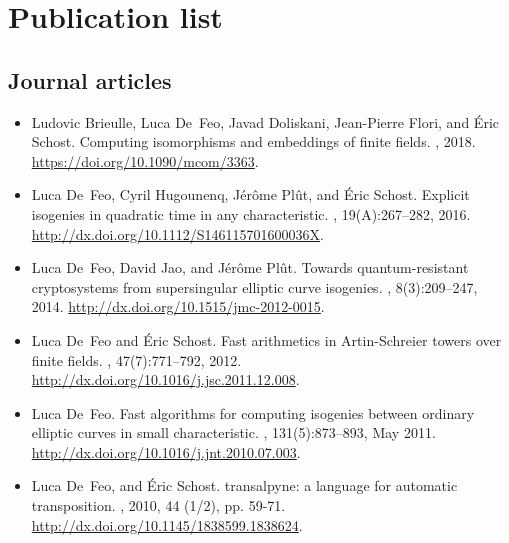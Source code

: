 \documentclass{book}
\begin{document}
\section*{Publication list}

\subsection*{Journal articles}
\begin{itemize}
\item
Ludovic Brieulle, Luca De~Feo, Javad Doliskani, Jean-Pierre Flori, and {\'E}ric
  Schost.
\newblock Computing isomorphisms and embeddings of finite fields.
, 2018.
\newblock \url{https://doi.org/10.1090/mcom/3363}.

\item
Luca De~Feo, Cyril Hugounenq, J{\'e}r{\^o}me Pl{\^u}t, and {\'E}ric Schost.
\newblock Explicit isogenies in quadratic time in any characteristic.
, 19(A):267--282,
  2016.
  \newblock \url{http://dx.doi.org/10.1112/S146115701600036X}.
  
\item
Luca De~Feo, David Jao, and J{\'e}r{\^o}me Pl{\^u}t.
\newblock Towards quantum-resistant cryptosystems from supersingular elliptic
  curve isogenies.
, 8(3):209--247, 2014.
\newblock \url{http://dx.doi.org/10.1515/jmc-2012-0015}.

\item
Luca De~Feo and {\'E}ric Schost.
\newblock Fast arithmetics in {A}rtin-{S}chreier towers over finite fields.
, 47(7):771--792, 2012.
\newblock \url{http://dx.doi.org/10.1016/j.jsc.2011.12.008}.

\item
Luca De~Feo.
\newblock Fast algorithms for computing isogenies between ordinary elliptic
  curves in small characteristic.
, 131(5):873--893, May 2011.
\newblock \url{http://dx.doi.org/10.1016/j.jnt.2010.07.003}.

\item
  Luca De~Feo, and Éric Schost.
  \newblock transalpyne: a language for automatic transposition.
  , 2010, 44 (1/2), pp. 59-71.
  \newblock \url{http://dx.doi.org/10.1145/1838599.1838624}.
\end{itemize}
\end{document}
